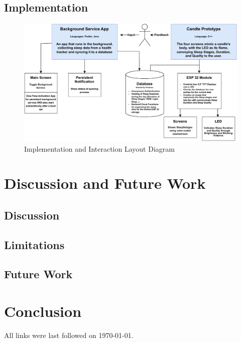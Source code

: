 \documentclass[
  a4paper,  %
  twoside,  %
  bibliography=totoc,
  headsepline,
  cleardoublepage=empty,
  parskip=half,
  draft=false
]{scrbook}
\begin{document}
\section{Implementation}

\begin{figure}
    \centering
    \includegraphics[height=\paperheight, width=\paperwidth, angle=90, keepaspectratio]{graphics/InputOutput.drawio (3).pdf}
    \caption{Implementation and Interaction Layout Diagram}
    \label{fig:enter-label}
\end{figure}

\chapter{Discussion and Future Work}
\section{Discussion}
\section{Limitations}
\section{Future Work}

\chapter{Conclusion}


\printbibliography

All links were last followed on \today.

\appendix
%

\pagestyle{empty}
\renewcommand*{\chapterpagestyle}{empty}
\Affirmation
\end{document}
